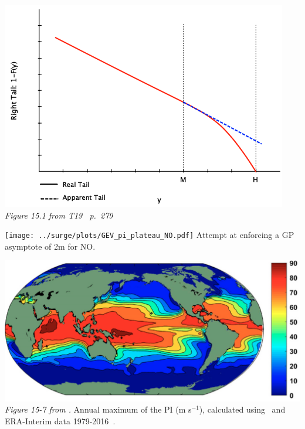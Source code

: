 \begin{frame}{%
}
\centering
\vspace{-1pt}
 \begin{minipage}{0.45\textwidth}
    \centering
    \includegraphics[width=1\linewidth]{images/taleb-limit-slimmed.png}\\
    \textit{Figure 15.1 from T19~\cite{taleb2019statistical} p.~279}
   \end{minipage} \begin{minipage}{0.45\textwidth}
   \texttt{[image: ../surge/plots/GEV\_pi\_plateau\_NO.pdf]}
   Attempt at enforcing a GP asymptote of 2m for NO.
   \end{minipage}
\includegraphics[width=0.7\linewidth]{images/PI-max-year.png}\\
\textit{Figure 15-7 from \cite{emanuel2018progress}.}
Annual maximum of the PI (m s$^{-1}$), calculated using~\cite{bister2002low}
and ERA-Interim data 1979-2016~\cite{dee2011era, berrisford2009era}.

\end{frame}


